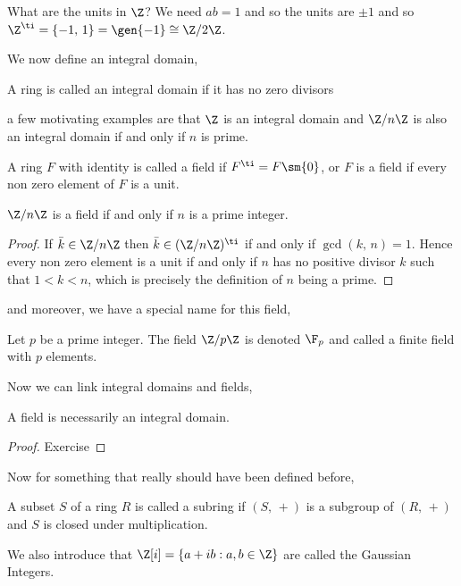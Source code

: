 
\begin{eg}
  What are the units in $\Z$? We need $ab = 1$ and so the units are $\pm 1$ and so $\Z^\ti = \{-1,\,1\} = \gen{-1} \cong \Z/2\Z$.\\
\end{eg}

We now define an integral domain,
\begin{ndefi}
  A ring is called an integral domain if it has no zero divisors
\end{ndefi}

a few motivating examples are that $\Z$ is an integral domain and $\Z/n\Z$ is also an integral domain if and only if $n$ is prime.

\begin{ndefi}[Field]
  A ring $F$ with identity is called a field if $F^\ti = F \sm \{0\}$, or $F$ is a field if every non zero element of $F$ is a unit.
\end{ndefi}

\begin{nlemma}
  $\Z/n\Z$ is a field if and only if $n$ is a prime integer.
\end{nlemma}
\begin{proof}
  If $\bar k \in \Z/n\Z$ then $\bar k \in (\Z/n\Z)^\ti$ if and only if $\gcd(k,\,n)=1$. Hence every non zero element is a unit if and only if $n$ has no positive divisor $k$ such that $1 < k < n$, which is precisely the definition of $n$ being a prime.
\end{proof}

and moreover, we have a special name for this field,
\begin{ndefi}
  Let $p$ be a prime integer. The field $\Z/p\Z$ is denoted $\F_p$ and called a finite field with $p$ elements.
\end{ndefi}

Now we can link integral domains and fields,
\begin{nlemma}
  A field is necessarily an integral domain.
\end{nlemma}
\begin{proof}
  Exercise
\end{proof}

Now for something that really should have been defined before,
\begin{ndefi}[Subring]
  A subset $S$ of a ring $R$ is called a subring if $(S,\,+)$ is a subgroup of $(R,\,+)$ and $S$ is closed under multiplication.
\end{ndefi}

We also introduce that $\Z[i] = \{a + ib : a, b \in \Z\}$ are called the Gaussian Integers.
